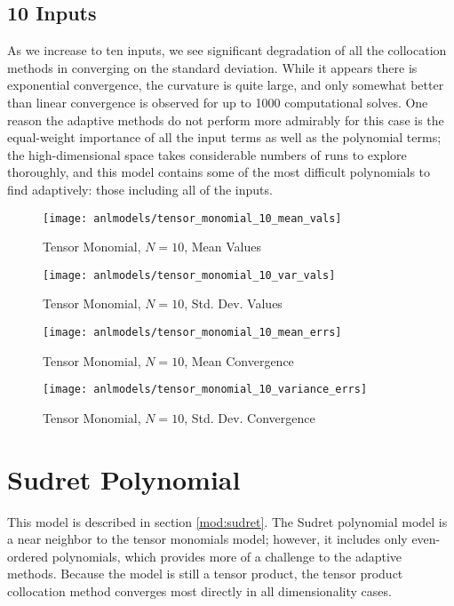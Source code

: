 \subsection{10 Inputs}
As we increase to ten inputs, we see significant degradation of all the collocation methods in converging on
the standard deviation.  While it appears there is exponential convergence, the curvature is quite large, and
only somewhat better than linear convergence is observed for up to 1000 computational solves.  One reason the
adaptive methods do not perform more admirably for this case is the equal-weight importance of all the input
terms as well as the polynomial terms; the high-dimensional space takes considerable numbers of runs to
explore thoroughly, and this model contains some of the most difficult polynomials to find adaptively: those including
all of the inputs. 
\begin{figure}[H]
  \centering
  \texttt{[image: anlmodels/tensor\_monomial\_10\_mean\_vals]}
  \caption{Tensor Monomial, $N=10$, Mean Values}
  \label{fig:tensormono mean values 10}
\end{figure}
\begin{figure}[H]
  \centering
  \texttt{[image: anlmodels/tensor\_monomial\_10\_var\_vals]}
  \caption{Tensor Monomial, $N=10$, Std. Dev. Values}
  \label{fig:tensormono var values 10}
\end{figure}

\begin{figure}[H]
  \centering
  \texttt{[image: anlmodels/tensor\_monomial\_10\_mean\_errs]}
  \caption{Tensor Monomial, $N=10$, Mean Convergence}
  \label{fig:tensormono mean errors 10}
\end{figure}
\begin{figure}[H]
  \centering
  \texttt{[image: anlmodels/tensor\_monomial\_10\_variance\_errs]}
  \caption{Tensor Monomial, $N=10$, Std. Dev. Convergence}
  \label{fig:tensormono var errors 10}
\end{figure}


\section{Sudret Polynomial}
This model is described in section \ref{mod:sudret}.  The Sudret polynomial model is a near neighbor to the
tensor monomials model; however, it includes only even-ordered polynomials, which provides more of a challenge
to the adaptive methods.  Because the model is still a tensor product, the tensor product collocation method 
converges most directly in all dimensionality cases.

